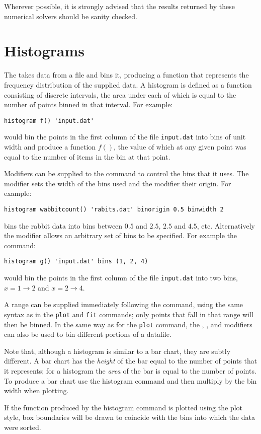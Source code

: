 Wherever possible, it is strongly advised that the results returned by these
numerical solvers should be sanity checked.

\section{Histograms}

The  takes data from a file and bins it, producing a
function that represents the frequency distribution of the supplied data.  A
histogram is defined as a function consisting of discrete intervals, the area
under each of which is equal to the number of points binned in that interval.
For example:

\begin{verbatim}
histogram f() 'input.dat'
\end{verbatim}

\noindent would bin the points in the first column of the file {\tt input.dat}
into bins of unit width and produce a function $f()$, the value of which at any
given point was equal to the number of items in the bin at that point.

Modifiers can be supplied to the  command to control the bins
that it uses.  The  modifier sets the width of the bins used
and the  modifier their origin.  For example:

\begin{verbatim}
histogram wabbitcount() 'rabits.dat' binorigin 0.5 binwidth 2
\end{verbatim}

\noindent bins the rabbit data into bins between $0.5$ and $2.5$, $2.5$ and
$4.5$, etc.  Alternatively the  modifier allows an arbitrary set
of bins to be specified. For example the command:

\begin{verbatim}
histogram g() 'input.dat' bins (1, 2, 4)
\end{verbatim}

\noindent would bin the points in the first column of the file {\tt input.dat}
into two bins, $x=1\to 2$ and $x=2\to 4$.

A range can be supplied immediately following the command, using the same
syntax as in the {\tt plot} and {\tt fit} commands; only points that fall in
that range will then be binned.  In the same way as for the {\tt plot} command,
the , ,  and 
modifiers can also be used to bin different portions of a datafile.

Note that, although a histogram is similar to a bar chart, they are subtly
different.  A bar chart has the {\it height} of the bar equal to the number of
points that it represents; for a histogram the {\it area} of the bar is equal to
the number of points.  To produce a bar chart use the histogram
command and then multiply by the bin width when plotting.

If the function produced by the histogram command is plotted using the
 plot style, box boundaries will be drawn to coincide with the
bins into which the data were sorted.
